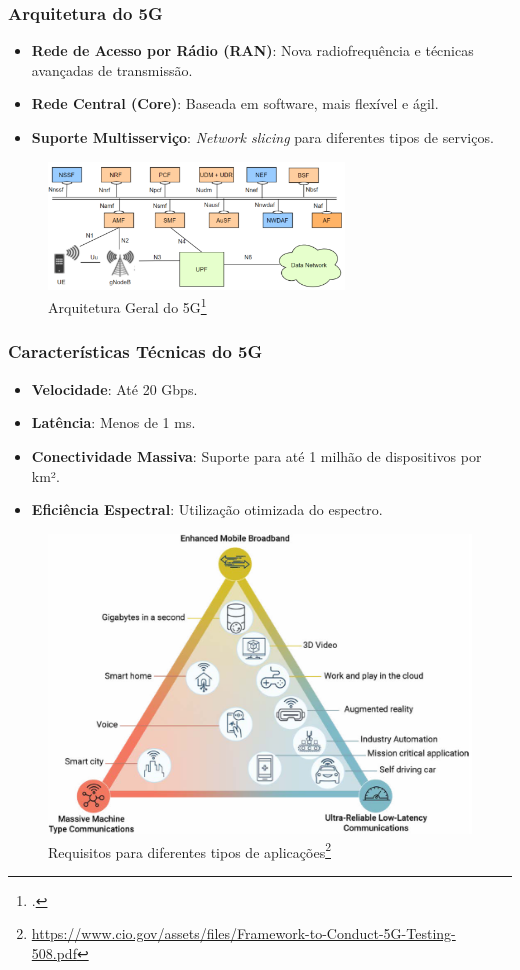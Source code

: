 \begin{frame}
    \frametitle{Arquitetura do 5G}
    \begin{itemize}
        \item \textbf{Rede de Acesso por Rádio (RAN)}: Nova radiofrequência e técnicas avançadas de transmissão.
        \item \textbf{Rede Central (Core)}: Baseada em software, mais flexível e ágil.
        \item \textbf{Suporte Multisserviço}: \textit{Network slicing} para diferentes tipos de serviços.
    \end{itemize}
    \begin{figure}
        \centering
        \includegraphics[width=0.7\textwidth]{figs/ArquiteturaGeral5G}
        \caption{Arquitetura Geral do 5G\footcite{5G_architecture}}
    \end{figure}
    \vspace{0.4cm}
\end{frame}

\begin{frame}
    \frametitle{Características Técnicas do 5G}
    \begin{itemize}
        \item \textbf{Velocidade}: Até 20 Gbps.
        \item \textbf{Latência}: Menos de 1 ms.
        \item \textbf{Conectividade Massiva}: Suporte para até 1 milhão de dispositivos por km².
        \item \textbf{Eficiência Espectral}: Utilização otimizada do espectro.
    \end{itemize}
    \begin{figure}
        \centering
        \includegraphics[width=0.5\linewidth]{figs/5G_verticais.png}
        \caption{Requisitos para diferentes tipos de aplicações\footnote{\href{https://www.cio.gov/assets/files/Framework-to-Conduct-5G-Testing-508.pdf}{https://www.cio.gov/assets/files/Framework-to-Conduct-5G-Testing-508.pdf}}}
    \end{figure}
\end{frame}